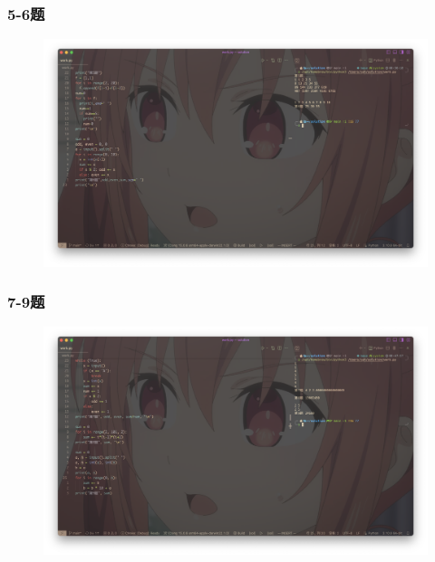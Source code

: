 \documentclass{beamer}
\begin{document}
  \begin{frame}[fragile]
    \frametitle{5-6题}
    \begin{figure}[!htb] %
      \includegraphics[width=1\textwidth,height=0.8\textheight]{./graph/python-5.5-5.6.png} %
    \end{figure}
  \end{frame}
  \begin{frame}[fragile]
    \frametitle{7-9题}
    \begin{figure}[!htb] %
      \includegraphics[width=1\textwidth,height=0.8\textheight]{./graph/python-5.7-5.8.png} %
    \end{figure}
  \end{frame}
\end{document}
